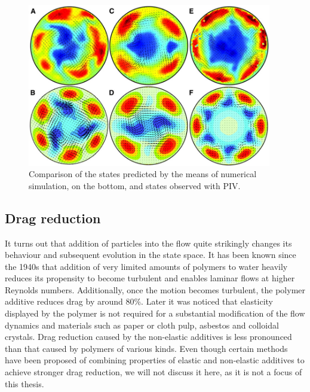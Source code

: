 \documentclass[11pt,a4paper]{article}
\begin{document}
\begin{figure}[h]
    \centering
    \includegraphics[width=0.95\textwidth]{experiment_vs_simulation.png}
    \caption{Comparison of the states predicted by the means of numerical simulation, on the bottom, and states observed with PIV\cite{Hof04etal}.}\label{img:ex_simu}
\end{figure}

\subsection{Drag reduction}

It turns out that addition of particles into the flow quite strikingly changes its behaviour and subsequent evolution in the state space.
It has been known since the 1940s\cite{Toms49}\cite{Mysels72} that addition of very limited amounts of polymers to water heavily reduces its propensity to become turbulent and enables laminar flows at higher Reynolds numbers.
Additionally, once the motion becomes turbulent, the polymer additive reduces drag by around 80\%\cite{Sreenivasan00}.
Later it was noticed that elasticity displayed by the polymer is not required for a substantial modification of the flow dynamics\cite{Pashkewitz04} and materials such as paper or cloth pulp\cite{Radin75}\cite{Robertson57}, asbestos\cite{Mccomb85} and colloidal crystals\cite{Pirith72}\cite{Radin75}.
Drag reduction caused by the non-elastic additives is less pronounced than that caused by polymers of various kinds.
Even though certain methods have been proposed\cite{Pashkewitz04}\cite{Lee74} of combining properties of elastic and non-elastic additives to achieve stronger drag reduction, we will not discuss it here, as it is not a focus of this thesis.
\end{document}

